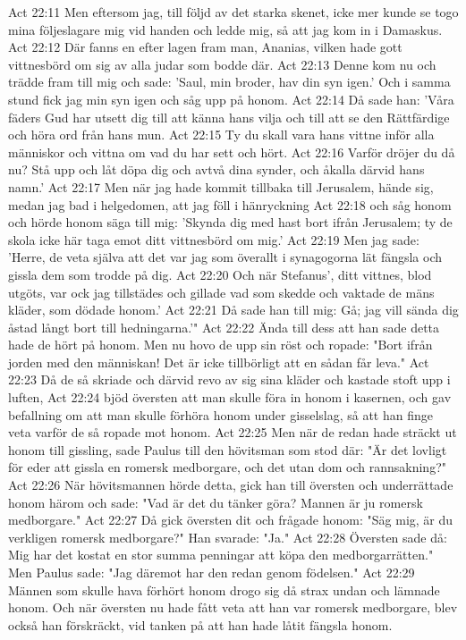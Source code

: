 Act 22:11  Men eftersom jag, till följd av det starka skenet, icke mer kunde se togo mina följeslagare mig vid handen och ledde mig, så att jag kom in i Damaskus.
Act 22:12  Där fanns en efter lagen fram man, Ananias, vilken hade gott vittnesbörd om sig av alla judar som bodde där.
Act 22:13  Denne kom nu och trädde fram till mig och sade: 'Saul, min broder, hav din syn igen.' Och i samma stund fick jag min syn igen och såg upp på honom.
Act 22:14  Då sade han: 'Våra fäders Gud har utsett dig till att känna hans vilja och till att se den Rättfärdige och höra ord från hans mun.
Act 22:15  Ty du skall vara hans vittne inför alla människor och vittna om vad du har sett och hört.
Act 22:16  Varför dröjer du då nu? Stå upp och låt döpa dig och avtvå dina synder, och åkalla därvid hans namn.'
Act 22:17  Men när jag hade kommit tillbaka till Jerusalem, hände sig, medan jag bad i helgedomen, att jag föll i hänryckning
Act 22:18  och såg honom och hörde honom säga till mig: 'Skynda dig med hast bort ifrån Jerusalem; ty de skola icke här taga emot ditt vittnesbörd om mig.'
Act 22:19  Men jag sade: 'Herre, de veta själva att det var jag som överallt i synagogorna lät fängsla och gissla dem som trodde på dig.
Act 22:20  Och när Stefanus', ditt vittnes, blod utgöts, var ock jag tillstädes och gillade vad som skedde och vaktade de mäns kläder, som dödade honom.'
Act 22:21  Då sade han till mig: Gå; jag vill sända dig åstad långt bort till hedningarna.'"
Act 22:22  Ända till dess att han sade detta hade de hört på honom. Men nu hovo de upp sin röst och ropade: "Bort ifrån jorden med den människan! Det är icke tillbörligt att en sådan får leva."
Act 22:23  Då de så skriade och därvid revo av sig sina kläder och kastade stoft upp i luften,
Act 22:24  bjöd översten att man skulle föra in honom i kasernen, och gav befallning om att man skulle förhöra honom under gisselslag, så att han finge veta varför de så ropade mot honom.
Act 22:25  Men när de redan hade sträckt ut honom till gissling, sade Paulus till den hövitsman som stod där: "Är det lovligt för eder att gissla en romersk medborgare, och det utan dom och rannsakning?"
Act 22:26  När hövitsmannen hörde detta, gick han till översten och underrättade honom härom och sade: "Vad är det du tänker göra? Mannen är ju romersk medborgare."
Act 22:27  Då gick översten dit och frågade honom: "Säg mig, är du verkligen romersk medborgare?" Han svarade: "Ja."
Act 22:28  Översten sade då: Mig har det kostat en stor summa penningar att köpa den medborgarrätten." Men Paulus sade: "Jag däremot har den redan genom födelsen."
Act 22:29  Männen som skulle hava förhört honom drogo sig då strax undan och lämnade honom. Och när översten nu hade fått veta att han var romersk medborgare, blev också han förskräckt, vid tanken på att han hade låtit fängsla honom.
